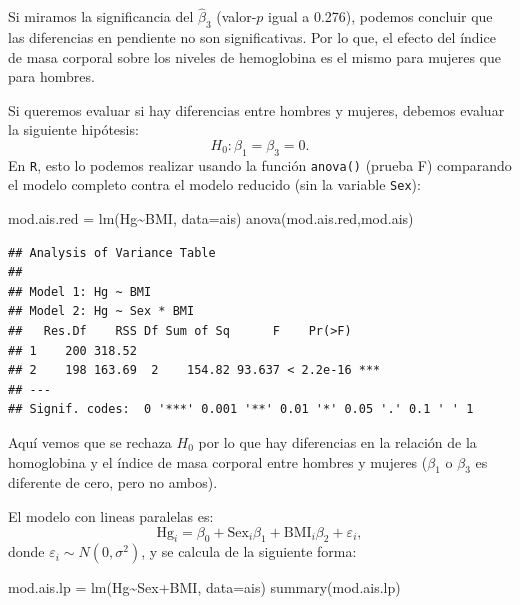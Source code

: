 \documentclass[
]{article}
\newenvironment{Shaded}{\begin{snugshade}}{\end{snugshade}}
\newcommand{\AttributeTok}[1]{\textcolor[rgb]{0.77,0.63,0.00}{#1}}
\newcommand{\FunctionTok}[1]{\textcolor[rgb]{0.00,0.00,0.00}{#1}}
\newcommand{\NormalTok}[1]{#1}
\newcommand{\OtherTok}[1]{\textcolor[rgb]{0.56,0.35,0.01}{#1}}
\newcommand{\SpecialCharTok}[1]{\textcolor[rgb]{0.00,0.00,0.00}{#1}}
\begin{document}
Si miramos la significancia del \(\widehat{\beta}_3\) (valor-\(p\) igual a 0.276), podemos concluir que las diferencias en pendiente no son significativas. Por lo que, el efecto del índice de masa corporal sobre los niveles de hemoglobina es el mismo para mujeres que para hombres.

Si queremos evaluar si hay diferencias entre hombres y mujeres, debemos evaluar la siguiente hipótesis:
\[
H_{0}: \beta_{1} = \beta_3 = 0.
\]
En \texttt{R}, esto lo podemos realizar usando la función \texttt{anova()} (prueba F) comparando el modelo completo contra el modelo reducido (sin la variable \texttt{Sex}):

\begin{Shaded}
\begin{Highlighting}[]
\NormalTok{mod.ais.red }\OtherTok{=} \FunctionTok{lm}\NormalTok{(Hg}\SpecialCharTok{\textasciitilde{}}\NormalTok{BMI, }\AttributeTok{data=}\NormalTok{ais)}
\FunctionTok{anova}\NormalTok{(mod.ais.red,mod.ais)}
\end{Highlighting}
\end{Shaded}

\begin{verbatim}
## Analysis of Variance Table
## 
## Model 1: Hg ~ BMI
## Model 2: Hg ~ Sex * BMI
##   Res.Df    RSS Df Sum of Sq      F    Pr(>F)    
## 1    200 318.52                                  
## 2    198 163.69  2    154.82 93.637 < 2.2e-16 ***
## ---
## Signif. codes:  0 '***' 0.001 '**' 0.01 '*' 0.05 '.' 0.1 ' ' 1
\end{verbatim}

Aquí vemos que se rechaza \(H_0\) por lo que hay diferencias en la relación de la homoglobina y el índice de masa corporal entre hombres y mujeres (\(\beta_1\) o \(\beta_3\) es diferente de cero, pero no ambos).

El modelo con lineas paralelas es:
\[
\mbox{Hg}_{i} = \beta_{0} + \mbox{Sex}_{i}\beta_{1} + \mbox{BMI}_{i}\beta_{2} +  \varepsilon_{i},
\]
donde \(\varepsilon_{i} \sim N(0, \sigma^{2})\), y se calcula de la siguiente forma:

\begin{Shaded}
\begin{Highlighting}[]
\NormalTok{mod.ais.lp }\OtherTok{=} \FunctionTok{lm}\NormalTok{(Hg}\SpecialCharTok{\textasciitilde{}}\NormalTok{Sex}\SpecialCharTok{+}\NormalTok{BMI, }\AttributeTok{data=}\NormalTok{ais)}
\FunctionTok{summary}\NormalTok{(mod.ais.lp)}
\end{Highlighting}
\end{Shaded}
\end{document}
